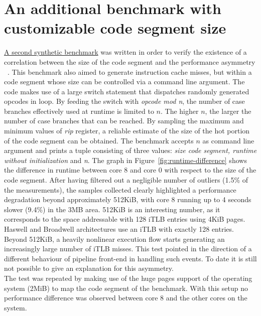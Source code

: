 \documentclass[a4paper]{jpconf}
\begin{document}
\section{An additional benchmark with customizable code segment size}
\label{section:benchmark-itlb}
\href{https://gitlab.cern.ch/snippets/217}{A second synthetic benchmark}
was written in order to verify the existence of a
correlation between the size of the code segment and the performance
asymmetry ~\cite{synthetic_benchmark:icache_misses_variable_code_segment}. 
This benchmark also aimed to generate instruction cache misses,
but within a code segment whose size can be controlled via a command line
argument. The code makes use of a large switch statement that dispatches
randomly generated opcodes in loop. By feeding the switch with \textit{opcode mod n}, the number of case
branches effectively used at runtime is limited to $n$. The higher $n$, the larger the
number of case branches that can be reached. By sampling the
maximum and minimum values of \textit{rip} register, a reliable estimate of the
size of the hot portion of the code segment can be obtained. The
benchmark accepts $n$ as command line argument and prints a tuple consisting of
three values: \textit{size code segment, runtime without initialization} and \textit{n}.
The graph in Figure~\ref{fig:runtime-difference} shows the difference in runtime
between core 8 and core 0 with respect to the size of the code segment. After having
filtered out a negligible number of outliers (1.5\% of the measurements),
the samples collected clearly highlighted a performance
degradation beyond approximately 512KiB, with core 8 running up to 4 seconds slower
(9.4\%) in the 3MB area. 512KiB is an interesting number, as it
corresponds to the space addressable with 128 iTLB entries using 4KiB pages.
Haswell and Broadwell architectures use an iTLB with exactly 128 entries.
Beyond 512KiB, a heavily nonlinear execution flow starts generating an increasingly
large number of iTLB misses. This test pointed in the direction of a different
behaviour of pipeline front-end in handling such events. To date
it is still not possible to give an explanation for this asymmetry.
\\
The test was repeated by making use of the huge pages support of the operating
system (2MiB) to map the code segment of the benchmark. With this setup no 
performance difference was observed between core 8 and the other cores on the system.
\end{document}

